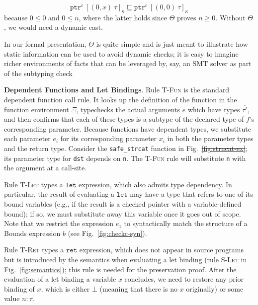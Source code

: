 \documentclass[conference]{IEEEtran}
\newcommand{\myparagraph}[1]{\textbf{#1}.\xspace}
\newcommand{\code}[1]{\lstinline|#1|}
\newcommand{\kw}[1]{\ensuremath{\mathtt{#1}}}
\newcommand{\tallarrayb}[2]{\ensuremath{[{#1}~{#2}]_{\kappa}}}
\newcommand{\tallarray}[3]{\tallarrayb{({#1},{#2})}{#3}}
\newcommand{\tptr}[2]{\ensuremath{\mathtt{ptr}^{#2}~{#1}}}
\newcommand{\tallarrayptr}[4]{{\tptr{\tallarray{#1}{#2}{#3}}{#4}}}
\newcommand{\evalue}[2]{\ensuremath{{#1}\!:\!{#2}}}
\newcommand{\elettext}{\ensuremath{\kw{let}}}
\newcommand{\erettext}{\ensuremath{\kw{ret}}}
\providecommand{\DIFadd}[1]{{\protect\color{blue}\uwave{#1}}} %
\providecommand{\DIFdel}[1]{{\protect\color{red}\sout{#1}}}                      %
\providecommand{\DIFaddbegin}{} %
\providecommand{\DIFaddend}{} %
\providecommand{\DIFdelbegin}{} %
\providecommand{\DIFdelend}{} %
\newcommand{\DIFscaledelfig}{0.5}
\newlength{\DIFdelgraphicswidth} %
\newlength{\DIFdelgraphicsheight} %
\newcommand{\DIFaddincludegraphics}[2][]{{\color{blue}\fbox{\DIFOincludegraphics[#1]{#2}}}} %
\newcommand{\DIFdelincludegraphics}[2][]{%
\sbox{\DIFdelgraphicsbox}{\DIFOincludegraphics[#1]{#2}}%
\settoboxwidth{\DIFdelgraphicswidth}{\DIFdelgraphicsbox} %
\settoboxtotalheight{\DIFdelgraphicsheight}{\DIFdelgraphicsbox} %
\scalebox{\DIFscaledelfig}{%
\parbox[b]{\DIFdelgraphicswidth}{\usebox{\DIFdelgraphicsbox}\\[-\baselineskip] \rule{\DIFdelgraphicswidth}{0em}}\llap{\resizebox{\DIFdelgraphicswidth}{\DIFdelgraphicsheight}{%
\setlength{\unitlength}{\DIFdelgraphicswidth}%
\begin{picture}(1,1)%
\thicklines\linethickness{2pt} %
{\color[rgb]{1,0,0}\put(0,0){\framebox(1,1){}}}%
{\color[rgb]{1,0,0}\put(0,0){\line( 1,1){1}}}%
{\color[rgb]{1,0,0}\put(0,1){\line(1,-1){1}}}%
\end{picture}%
}\hspace*{3pt}}} %
} %
\DeclareRobustCommand{\DIFaddbegin}{\DIFOaddbegin \let\includegraphics\DIFaddincludegraphics} %
\DeclareRobustCommand{\DIFaddend}{\DIFOaddend \let\includegraphics\DIFOincludegraphics} %
\DeclareRobustCommand{\DIFdelbegin}{\DIFOdelbegin \let\includegraphics\DIFdelincludegraphics} %
\DeclareRobustCommand{\DIFdelend}{\DIFOaddend \let\includegraphics\DIFOincludegraphics} %
\begin{document}
\DIFaddend {\small
$$
\DIFdelbegin %
\DIFdelend \DIFaddbegin \tallarrayptr{0}{x}{\tau}{c} \DIFaddend \sqsubseteq \tallarrayptr{0}{0}{\tau}{c}
$$
}
because $0 \leq 0$ and \DIFdelbegin \DIFdel{$0 \leq n$}\DIFdelend \DIFaddbegin \DIFadd{$0 \leq x$}\DIFaddend , where the latter holds since
$\Theta$ proves \DIFdelbegin \DIFdel{$n \ge 0$}\DIFdelend \DIFaddbegin \DIFadd{$x \ge 0$}\DIFaddend .  Without $\Theta$, we would need a
dynamic cast.

In our formal presentation, $\Theta$ is quite simple and is just meant
to illustrate how static information can be used to avoid dynamic
checks; it is easy to imagine richer environments of facts that can be
leveraged by, say, an SMT solver as part of the subtyping
check \cite{LiquidHaskell,Refinementlh}





\myparagraph{Dependent Functions and Let Bindings}
Rule \textsc{T-Fun} is the standard dependent function call rule. It
looks up the definition of the function in the function environment
$\Xi$, typechecks the actual arguments $\overline{e}$ which have
types $\overline{\tau'}$, and then confirms that each of these types
is a subtype of the declared type of $f$'s corresponding parameter. Because
functions have dependent types, we substitute each parameter $e_i$ for
its corresponding parameter $x_i$ in both the parameter types and the
return type. Consider the \DIFdelbegin %
\DIFdelend \DIFaddbegin \code{safe_strcat} \DIFaddend function in
Fig.~\DIFdelbegin \DIFdel{\ref{fig:strncat-ex}}\DIFdelend \DIFaddbegin \DIFadd{\ref{fig:strcat-ex}}\DIFaddend ; its parameter type for \DIFdelbegin %
\DIFdelend \DIFaddbegin \code{dst} 
\DIFaddend depends on \code{n}. The \textsc{T-Fun} rule will substitute 
\code{n} with the argument at a call-site.

Rule \textsc{T-Let} types a $\elettext$ expression, which also admits
type dependency. In particular, the result of evaluating a $\elettext$
may have a type that refers to one of its bound variables (e.g., if
the result is a checked pointer with a variable-defined bound); if so,
we must substitute away this variable once it goes out of scope. Note
that we restrict the expression $e_1$ to syntactically match the
structure of a Bounds expression $b$ (see Fig.~\ref{fig:checkc-syn}).

Rule \textsc{T-Ret} types a $\erettext$ expression, which does not
appear in source programs but is introduced by the semantics when
evaluating a let binding (rule \textsc{S-Let} in
Fig.~\ref{fig:semantics}); this rule is needed for the preservation
proof. After the evaluation of a let binding a variable $x$ concludes,
we need to restore any prior binding of $x$, which is either
$\bot$ (meaning that there is no $x$ originally) or some value
$\evalue{n}{\tau}$.
\end{document}
